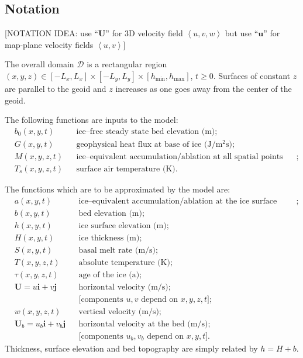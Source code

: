 \documentclass[12pt,final]{amsart}%
\theoremstyle{plain}
\theoremstyle{definition}
\theoremstyle{remark}
\newcommand{\ihat}{\mathbf{i}}
\newcommand{\jhat}{\mathbf{j}}
\newcommand{\hmin}{h_{\text{min}}}
\newcommand{\hmax}{h_{\text{max}}}
\newcommand{\bU}{{\mathbf{U}}}
\begin{document}
\subsection*{Notation}  [NOTATION IDEA: use ``$\mathbf{U}$'' for 3D velocity field $\left<u,v,w\right>$ but use ``$\mathbf{u}$'' for map-plane velocity fields $\left<u,v\right>$]

The overall domain $\mathcal{D}$ is a rectangular region $(x,y,z)\in [-L_x,L_x]\times [-L_y,L_y]\times[\hmin,\hmax]$, $t\ge 0$.  Surfaces of constant $z$ are parallel to the geoid and $z$ increases as one goes away from the center of the geoid.

The following functions are inputs to the model:
\begin{align*}
&b_0(x,y,t) &&\text{ice--free steady state bed elevation (m)}; \\
&G(x,y,t) &&\text{geophysical heat flux at base of ice (J/$\text{m}^2$s)};\\
&M(x,y,z,t) &&\text{ice--equivalent accumulation/ablation at all spatial points (m/s)};\\
&T_s(x,y,z,t) &&\text{surface air temperature (K)}.
\end{align*}

The functions which are to be approximated by the model are:
\begin{align*}
&a(x,y,t) &&\text{ice--equivalent accumulation/ablation at the ice surface (m/s)};\\
&b(x,y,t) &&\text{bed elevation (m)}; \\
&h(x,y,t) &&\text{ice surface elevation (m)};\\
&H(x,y,t) &&\text{ice thickness (m)};\\
&S(x,y,t) &&\text{basal melt rate (m/s);}\\
&T(x,y,z,t) &&\text{absolute temperature (K)};\\
&\tau(x,y,z,t) &&\text{age of the ice (a)};\\
&\bU=u\ihat+v\jhat &&\text{horizontal velocity (m/s);}\\
&&& \text{[components } u,v \text{ depend on } x,y,z,t];\\
&w(x,y,z,t) &&\text{vertical velocity (m/s);}\\
&\bU_b=u_b\ihat+v_b\jhat &&\text{horizontal velocity at the bed (m/s);}\\
&&& \text{[components } u_b,v_b \text{ depend on } x,y,t].
\end{align*}
Thickness, surface elevation and bed topography are simply related by $h=H+b$.
\end{document}
